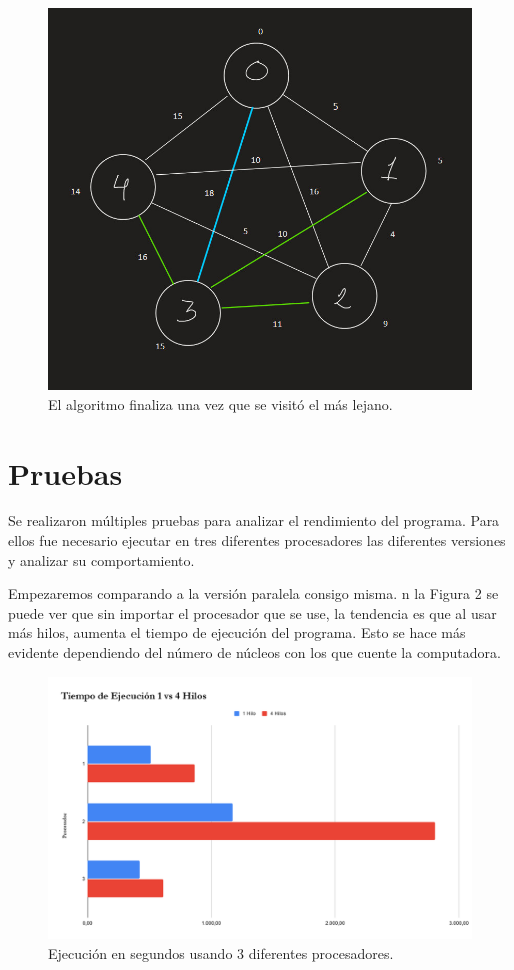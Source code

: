 \documentclass[11pt]{article}
\begin{document}
\begin{figure}[!htbp]
\centering
\includegraphics[scale = .5]{grafos5}
\caption{El algoritmo finaliza una vez que se visitó el más lejano.}
\end{figure}


\section{Pruebas}

\par
Se realizaron múltiples pruebas para analizar el rendimiento del programa. Para ellos fue necesario ejecutar en tres diferentes procesadores las diferentes versiones y analizar su comportamiento. 

\par
Empezaremos comparando a la versión paralela consigo misma. n la Figura 2 se puede ver que sin importar el procesador que se use, la tendencia es que al usar más hilos, aumenta el tiempo de ejecución del programa. Esto se hace más evidente dependiendo del número de núcleos con los que cuente la computadora.  

\begin{figure}[!h]
\centering
\includegraphics[width=0.9\linewidth]{hil1v4.png}
  \caption{Ejecución en segundos usando 3 diferentes procesadores.}
\end{figure}
\end{document}
